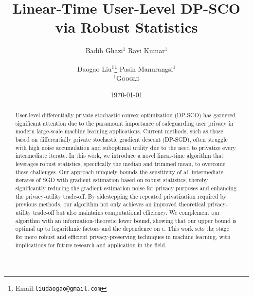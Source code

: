 \documentclass[11pt]{article}
\title{Linear-Time User-Level DP-SCO via Robust Statistics}
\author{
Badih Ghazi$^1$ \quad
Ravi Kumar$^1$\and
Daogao Liu$^1$\thanks{Email:\texttt{liudaogao@gmail.com}}\quad
Pasin Manurangsi$^1$ 
\\
\textsc{$^1$Google}
}
\date{\today}
\begin{document}
\maketitle

\begin{abstract}
    User-level differentially private stochastic convex optimization (DP-SCO) has garnered significant attention due to the paramount importance of safeguarding user privacy in modern large-scale machine learning applications. 
    Current methods, such as those based on differentially private stochastic gradient descent (DP-SGD), often struggle with high noise accumulation and suboptimal utility due to the need to privatize every intermediate iterate. 
    In this work, we introduce a novel linear-time algorithm that leverages robust statistics, specifically the median and trimmed mean, to overcome these challenges. 
    Our approach uniquely bounds the sensitivity of all intermediate iterates of SGD with gradient estimation based on robust statistics, thereby significantly reducing the gradient estimation noise for privacy purposes and enhancing the privacy-utility trade-off.  
    By sidestepping the repeated privatization required by previous methods, our algorithm not only achieves an improved theoretical privacy-utility trade-off but also maintains computational efficiency.
    We complement our algorithm with an information-theoretic lower bound, showing that our upper bound is optimal up to logarithmic factors and the dependence on $\epsilon$. 
    This work sets the stage for more robust and efficient privacy-preserving techniques in machine learning, with implications for future research and application in the field.
\end{abstract}










\newpage



\appendix



\end{document}
